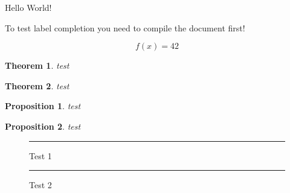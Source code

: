 \documentclass{article}
\newtheorem{theorem}{Theorem}
\newtheorem{proposition}{Proposition}
\begin{document}
Hello World!

To test label completion you need to compile the document first!

\begin{equation}
  f(x) = 42
  \label{eq:main-is-working}
\end{equation}

\begin{theorem}
  \label{th:first}
  test
\end{theorem}

\begin{theorem}
  \label{th:second}
  test
\end{theorem}

\begin{proposition}
  \label{prop:first}
  test
\end{proposition}

\begin{proposition}
  \label{prop:second}
  test
\end{proposition}

\begin{figure}
  \centering
  \rule{1cm}{1cm}
  \caption{Test 1}
  \label{fig:test1}
\end{figure}

\begin{figure}
  \centering
  \rule{1cm}{1cm}
  \caption{Test 2}
  \label{fig:test2}
\end{figure}
\end{document}
